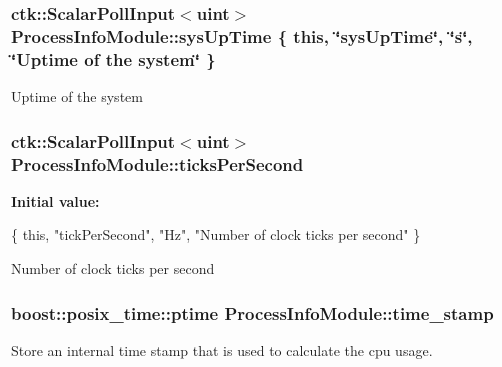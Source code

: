 \subsubsection[{\texorpdfstring{sys\+Up\+Time}{sysUpTime}}]{\setlength{\rightskip}{0pt plus 5cm}ctk\+::\+Scalar\+Poll\+Input$<$uint$>$ Process\+Info\+Module\+::sys\+Up\+Time \{ this, \char`\"{}sys\+Up\+Time\char`\"{}, \char`\"{}s\char`\"{}, \char`\"{}Uptime of the system\char`\"{} \}}\hypertarget{structProcessInfoModule_adbe9f029d44d0ca7d0943e2c9e27614c}{}\label{structProcessInfoModule_adbe9f029d44d0ca7d0943e2c9e27614c}
Uptime of the system 
\subsubsection[{\texorpdfstring{ticks\+Per\+Second}{ticksPerSecond}}]{\setlength{\rightskip}{0pt plus 5cm}ctk\+::\+Scalar\+Poll\+Input$<$uint$>$ Process\+Info\+Module\+::ticks\+Per\+Second}\hypertarget{structProcessInfoModule_a5555ea48a4e228afb662f9523ab6c42d}{}\label{structProcessInfoModule_a5555ea48a4e228afb662f9523ab6c42d}
{\bfseries Initial value\+:}
\begin{DoxyCode}
\{ \textcolor{keyword}{this}, \textcolor{stringliteral}{"tickPerSecond"}, \textcolor{stringliteral}{"Hz"},
      \textcolor{stringliteral}{"Number of clock ticks per second"} \}
\end{DoxyCode}
Number of clock ticks per second 
\subsubsection[{\texorpdfstring{time\+\_\+stamp}{time_stamp}}]{\setlength{\rightskip}{0pt plus 5cm}boost\+::posix\+\_\+time\+::ptime Process\+Info\+Module\+::time\+\_\+stamp}\hypertarget{structProcessInfoModule_af863af6e454aa703037963ad401cae92}{}\label{structProcessInfoModule_af863af6e454aa703037963ad401cae92}
Store an internal time stamp that is used to calculate the cpu usage. 
